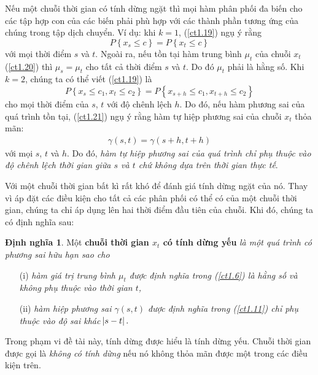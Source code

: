 \documentclass[12pt, a4paper,oneside]{book}
\theoremstyle{definition}
\newtheorem{dn}[theo]{Định nghĩa}
\begin{document}
Nếu một chuỗi thời gian có tính dừng ngặt thì mọi hàm phân phối đa biến cho các tập hợp con của các biến phải phù hợp với các thành phần tương ứng của chúng trong tập dịch chuyển. Ví dụ: khi $k = 1$, (\ref{ct1.19}) ngụ ý rằng
\begin{equation}
P\left\lbrace x_{s} \leqslant  c \right\rbrace = P\left\lbrace x_{t} \leqslant  c \right\rbrace \label{ct1.20}
\end{equation} 
với mọi thời điểm $s$ và $t$. Ngoài ra, nếu tồn tại hàm trung bình $\mu_{t}$ của chuỗi $x_{t}$ (\ref{ct1.20}) thì $\mu_{s}= \mu_{t}$ cho tất cả thời điểm $s$ và $t$. Do đó $\mu_{t}$ phải là hằng số. Khi $k=2$, chúng ta có thể viết (\ref{ct1.19}) là
\begin{equation}
P\left\lbrace x_{s}\leqslant c_{1}, x_{t}\leqslant c_{2}\right\rbrace = P\left\lbrace x_{s+h}\leqslant c_{1}, x_{t+h}\leqslant c_{2}\right\rbrace \label{ct1.21}
\end{equation}
cho mọi thời điểm của $ s $, $ t $ với độ chênh lệch $ h $. Do đó, nếu hàm phương sai của quá trình tồn tại, (\ref{ct1.21}) ngụ ý rằng hàm tự hiệp phương sai của chuỗi $x_{t}$ thỏa mãn:
\begin{align*}
\gamma(s,t)=\gamma(s+h, t+h)
\end{align*}
với mọi $s$, $t$ và $h$. Do đó, \textit{hàm tự hiệp phương sai của quá trình chỉ phụ thuộc vào độ chênh lệch thời gian giữa $s$ và $t$ chứ không dựa trên thời gian thực tế}.

Với một chuỗi thời gian bất kì rất khó để đánh giá tính dừng ngặt của nó. Thay vì áp đặt các điều kiện cho tất cả các phân phối có thể có của một chuỗi thời gian, chúng ta chỉ áp dụng lên hai thời điểm đầu tiên của chuỗi. Khi đó, chúng ta có định nghĩa sau:
\begin{dn}\cite{1} Một \textbf{chuỗi thời gian $x_t$ có tính dừng yếu} \textit{là một quá trình có phương sai hữu hạn sao cho}
	\begin{itemize}
		\item[(i)]\textit{hàm giá trị trung bình $\mu_{t}$ được định nghĩa trong (\ref{ct1.6}) là hằng số và không phụ thuộc vào thời gian $t$,}
		\item[(ii)]\textit{hàm hiệp phương sai $ \gamma(s, t)$ được định nghĩa trong (\ref{ct1.11}) chỉ phụ thuộc vào độ sai khác $ \abs{s-t}.$} \label{dntd}
	\end{itemize}
\end{dn}
Trong phạm vi đề tài này, tính dừng được hiểu là tính dừng yếu. Chuỗi thời gian được gọi là \textit{không có tính dừng} nếu nó không thỏa mãn được một trong các điều kiện trên.
\end{document}
